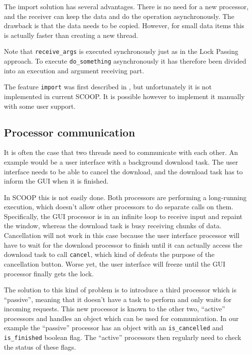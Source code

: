 The import solution has several advantages.
There is no need for a new processor, and the receiver can keep the data and do the operation asynchronously.
The drawback is that the data needs to be copied.
However, for small data items this is actually faster than creating a new thread.

Note that \lstinline!receive_args! is executed synchronously just as in the Lock Passing approach.
To execute \lstinline!do_something! asynchronously it has therefore been divided into an execution and argument receiving part.

The feature \lstinline!import! was first described in \cite[p. 106]{Nienaltowski07}, but unfortunately it is not implemented in current SCOOP.
It is possible however to implement it manually with some user support.

\subsection{Processor communication}
\label{sec:processor-communication}

It is often the case that two threads need to communicate with each other.
An example would be a user interface with a background download task.
The user interface needs to be able to cancel the download, and the download task has to inform the GUI when it is finished.

In SCOOP this is not easily done.
Both processors are performing a long-running execution, which doesn't allow other processors to do separate calls on them.
Specifically, the GUI processor is in an infinite loop to receive input and repaint the window, whereas the download task is busy receiving chunks of data.
Cancellation will not work in this case because the user interface processor will have to wait for the download processor to finish until it can actually access the download task to call \lstinline!cancel!, 
which kind of defeats the purpose of the cancellation button.
Worse yet, the user interface will freeze until the GUI processor finally gets the lock.

The solution to this kind of problem is to introduce a third processor which is ``passive'', meaning that it doesn't have a task to perform and only waits for incoming requests.
This new processor is known to the other two, ``active'' processors and handles an object which can be used for communication.
In our example the ``passive'' processor has an object with an \lstinline!is_cancelled! and \lstinline!is_finished! boolean flag.
The ``active'' processors then regularly need to check the status of these flags.

